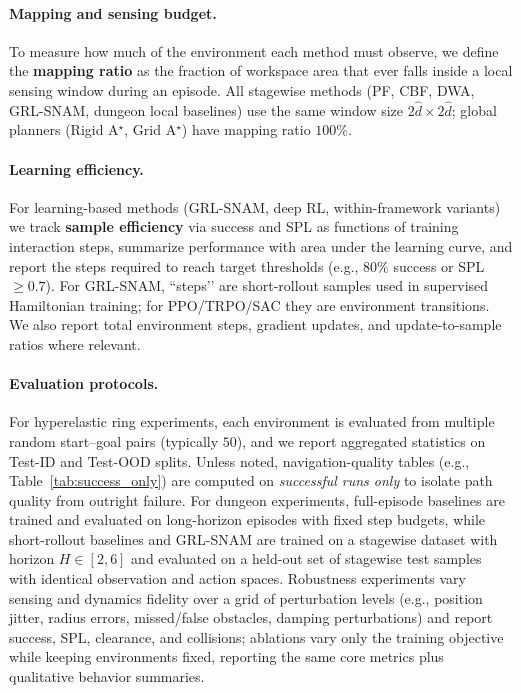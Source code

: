 \paragraph{Mapping and sensing budget.}
To measure how much of the environment each method must observe, we define the \textbf{mapping ratio} as the fraction of workspace area that ever falls inside a local sensing window during an episode. All stagewise methods (PF, CBF, DWA, GRL-SNAM, dungeon local baselines) use the same window size $2\hat d \times 2\hat d$; global planners (Rigid A$^{\star}$, Grid A$^{\star}$) have mapping ratio $100\%$.

\paragraph{Learning efficiency.}
For learning-based methods (GRL-SNAM, deep RL, within-framework variants) we track \textbf{sample efficiency} via success and SPL as functions of training interaction steps, summarize performance with area under the learning curve, and report the steps required to reach target thresholds (e.g., $80\%$ success or SPL $\geq 0.7$). For GRL-SNAM, “steps’’ are short-rollout samples used in supervised Hamiltonian training; for PPO/TRPO/SAC they are environment transitions. We also report total environment steps, gradient updates, and update-to-sample ratios where relevant.

\paragraph{Evaluation protocols.}
For hyperelastic ring experiments, each environment is evaluated from multiple random start–goal pairs (typically $50$), and we report aggregated statistics on Test-ID and Test-OOD splits. Unless noted, navigation-quality tables (e.g., Table~\ref{tab:success_only}) are computed on \emph{successful runs only} to isolate path quality from outright failure. For dungeon experiments, full-episode baselines are trained and evaluated on long-horizon episodes with fixed step budgets, while short-rollout baselines and GRL-SNAM are trained on a stagewise dataset with horizon $H \in [2,6]$ and evaluated on a held-out set of stagewise test samples with identical observation and action spaces. Robustness experiments vary sensing and dynamics fidelity over a grid of perturbation levels (e.g., position jitter, radius errors, missed/false obstacles, damping perturbations) and report success, SPL, clearance, and collisions; ablations vary only the training objective while keeping environments fixed, reporting the same core metrics plus qualitative behavior summaries.

